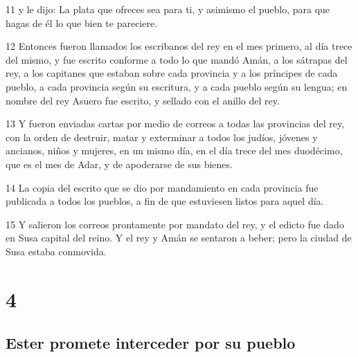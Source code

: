 \par 11 y le dijo: La plata que ofreces sea para ti, y asimismo el pueblo, para que hagas de él lo que bien te pareciere.
\par 12 Entonces fueron llamados los escribanos del rey en el mes primero, al día trece del mismo, y fue escrito conforme a todo lo que mandó Amán, a los sátrapas del rey, a los capitanes que estaban sobre cada provincia y a los príncipes de cada pueblo, a cada provincia según su escritura, y a cada pueblo según su lengua; en nombre del rey Asuero fue escrito, y sellado con el anillo del rey.
\par 13 Y fueron enviadas cartas por medio de correos a todas las provincias del rey, con la orden de destruir, matar y exterminar a todos los judíos, jóvenes y ancianos, niños y mujeres, en un mismo día, en el día trece del mes duodécimo, que es el mes de Adar, y de apoderarse de sus bienes.
\par 14 La copia del escrito que se dio por mandamiento en cada provincia fue publicada a todos los pueblos, a fin de que estuviesen listos para aquel día.
\par 15 Y salieron los correos prontamente por mandato del rey, y el edicto fue dado en Susa capital del reino. Y el rey y Amán se sentaron a beber; pero la ciudad de Susa estaba conmovida.

\chapter{4}

\section*{Ester promete interceder por su pueblo}

